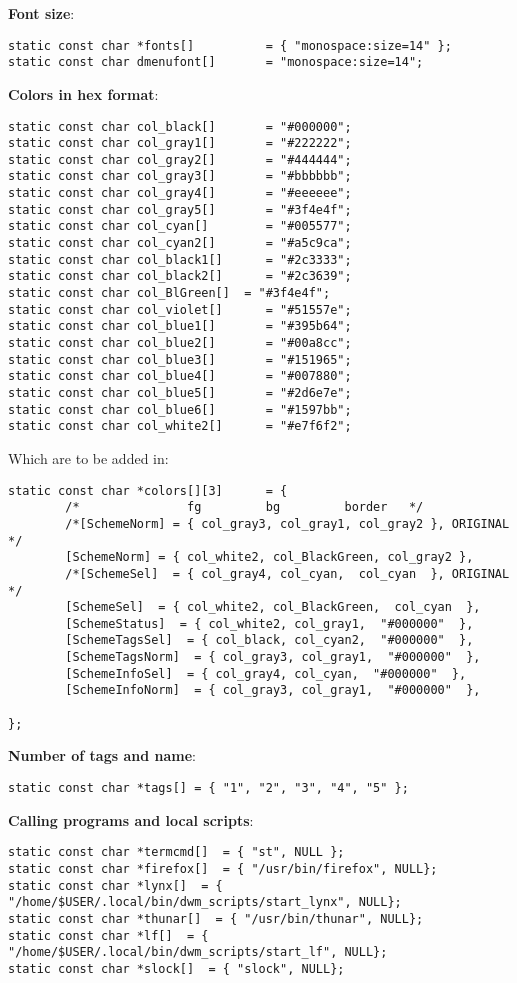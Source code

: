 \documentclass{article}
\begin{document}
\noindent\textbf{Font size}:
\begin{lstlisting}
static const char *fonts[]          = { "monospace:size=14" };
static const char dmenufont[]       = "monospace:size=14";
\end{lstlisting}

\noindent\textbf{Colors in hex format}:
\begin{lstlisting}
static const char col_black[]       = "#000000";
static const char col_gray1[]       = "#222222";
static const char col_gray2[]       = "#444444";
static const char col_gray3[]       = "#bbbbbb";
static const char col_gray4[]       = "#eeeeee";
static const char col_gray5[]       = "#3f4e4f";
static const char col_cyan[]        = "#005577";
static const char col_cyan2[]       = "#a5c9ca";
static const char col_black1[]      = "#2c3333";
static const char col_black2[]      = "#2c3639";
static const char col_BlGreen[]  = "#3f4e4f";
static const char col_violet[]      = "#51557e";
static const char col_blue1[]       = "#395b64";
static const char col_blue2[]       = "#00a8cc";
static const char col_blue3[]       = "#151965";
static const char col_blue4[]       = "#007880";
static const char col_blue5[]       = "#2d6e7e";
static const char col_blue6[]       = "#1597bb";
static const char col_white2[]      = "#e7f6f2";
\end{lstlisting}
Which are to be added in:
\begin{lstlisting}
static const char *colors[][3]      = {
        /*               fg         bg         border   */
        /*[SchemeNorm] = { col_gray3, col_gray1, col_gray2 }, ORIGINAL */
        [SchemeNorm] = { col_white2, col_BlackGreen, col_gray2 },
        /*[SchemeSel]  = { col_gray4, col_cyan,  col_cyan  }, ORIGINAL */
        [SchemeSel]  = { col_white2, col_BlackGreen,  col_cyan  },
        [SchemeStatus]  = { col_white2, col_gray1,  "#000000"  },
        [SchemeTagsSel]  = { col_black, col_cyan2,  "#000000"  },
        [SchemeTagsNorm]  = { col_gray3, col_gray1,  "#000000"  },
        [SchemeInfoSel]  = { col_gray4, col_cyan,  "#000000"  },
        [SchemeInfoNorm]  = { col_gray3, col_gray1,  "#000000"  },

};
\end{lstlisting}

\noindent\textbf{Number of tags and name}:
\begin{lstlisting}
static const char *tags[] = { "1", "2", "3", "4", "5" };
\end{lstlisting}

\noindent\textbf{Calling programs and local scripts}:
\begin{lstlisting}
static const char *termcmd[]  = { "st", NULL };
static const char *firefox[]  = { "/usr/bin/firefox", NULL};
static const char *lynx[]  = { "/home/$USER/.local/bin/dwm_scripts/start_lynx", NULL};
static const char *thunar[]  = { "/usr/bin/thunar", NULL};
static const char *lf[]  = { "/home/$USER/.local/bin/dwm_scripts/start_lf", NULL};
static const char *slock[]  = { "slock", NULL};
\end{lstlisting}
\end{document}
